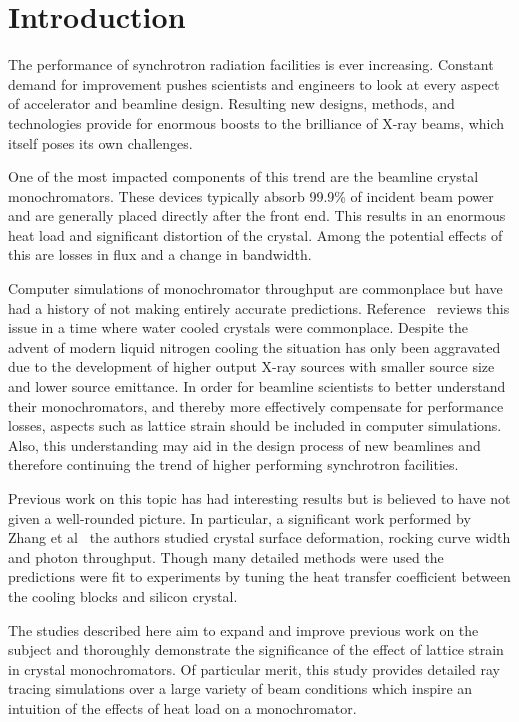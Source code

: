 \documentclass{iucr}
\begin{document}
\section{Introduction}

The performance of synchrotron radiation facilities is ever increasing. Constant demand for improvement pushes scientists and engineers to look at every aspect of accelerator and beamline design. Resulting new designs, methods, and technologies provide for enormous boosts to the brilliance of X-ray beams, which itself poses its own challenges.

One of the most impacted components of this trend are the beamline crystal monochromators. These devices typically absorb 99.9\% of incident beam power~\cite{willmott} and are generally placed directly after the front end. This results in an enormous heat load and significant distortion of the crystal. Among the potential effects of this are losses in flux and a change in bandwidth.

Computer simulations of monochromator throughput are commonplace but have had a history of not making entirely accurate predictions. Reference~\cite{innacuratepredictions} reviews this issue in a time where water cooled crystals were commonplace. Despite the advent of modern liquid nitrogen cooling the situation has only been aggravated due to the development of higher output X-ray sources with smaller source size and lower source emittance. In order for beamline scientists to better understand their monochromators, and thereby more effectively compensate for performance losses, aspects such as lattice strain should be included in computer simulations. Also, this understanding may aid in the design process of new beamlines and therefore continuing the trend of higher performing synchrotron facilities.

Previous work on this topic has had interesting results but is believed to have not given a well-rounded picture. In particular, a significant work performed by Zhang et al~\cite{Zhang} the authors studied crystal surface deformation, rocking curve width and photon throughput. Though many detailed methods were used the predictions were fit to experiments by tuning the heat transfer coefficient between the cooling blocks and silicon crystal.

The studies described here aim to expand and improve previous work on the subject and thoroughly demonstrate the significance of the effect of lattice strain in crystal monochromators. Of particular merit, this study provides detailed ray tracing simulations over a large variety of beam conditions which inspire an intuition of the effects of heat load on a monochromator.
\end{document}
